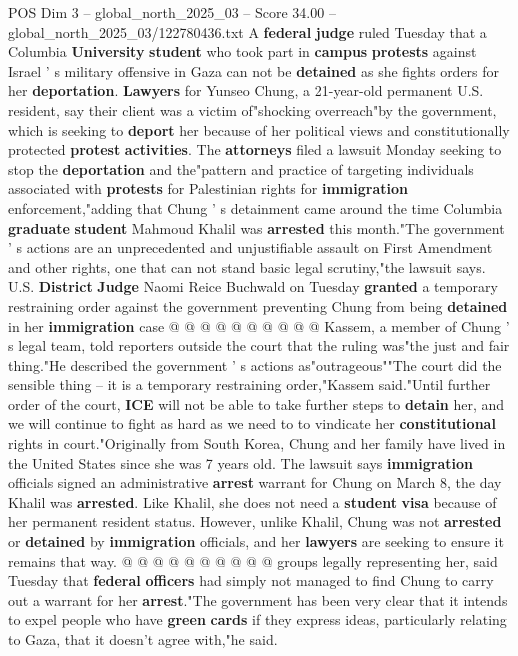 \begin{textsample}{POS Dim 3 – global\_north\_2025\_03 – Score 34.00 – global\_north\_2025\_03/122780436.txt}  \label{ex:f3_pos_027}
A \textbf{federal} \textbf{judge} ruled Tuesday that a Columbia \textbf{University} \textbf{student} who took part in \textbf{campus} \textbf{protests} against Israel ' s military offensive in Gaza can not be \textbf{detained} as she fights orders for her \textbf{deportation}. \textbf{Lawyers} for Yunseo Chung, a 21-year-old permanent U.S. resident, say their client was a victim of"shocking overreach"by the government, which is seeking to \textbf{deport} her because of her political views and constitutionally protected \textbf{protest} \textbf{activities}.
The \textbf{attorneys} filed a lawsuit Monday seeking to stop the \textbf{deportation} and the"pattern and practice of targeting individuals associated with \textbf{protests} for Palestinian rights for \textbf{immigration} enforcement,"adding that Chung ' s detainment came around the time Columbia \textbf{graduate} \textbf{student} Mahmoud Khalil was \textbf{arrested} this month."The government ' s actions are an unprecedented and unjustifiable assault on First Amendment and other rights, one that can not stand basic legal scrutiny,"the lawsuit says.
U.S. \textbf{District} \textbf{Judge} Naomi Reice Buchwald on Tuesday \textbf{granted} a temporary restraining order against the government preventing Chung from being \textbf{detained} in her \textbf{immigration} case @ @ @ @ @ @ @ @ @ @ Kassem, a member of Chung ' s legal team, told reporters outside the court that the ruling was"the just and fair thing."He described the government ' s actions as"outrageous""The court did the sensible thing -- it is a temporary restraining order,"Kassem said."Until further order of the court, \textbf{ICE} will not be able to take further steps to \textbf{detain} her, and we will continue to fight as hard as we need to to vindicate her \textbf{constitutional} rights in court."Originally from South Korea, Chung and her family have lived in the United States since she was 7 years old.
The lawsuit says \textbf{immigration} officials signed an administrative \textbf{arrest} warrant for Chung on March 8, the day Khalil was \textbf{arrested}.
Like Khalil, she does not need a \textbf{student} \textbf{visa} because of her permanent resident status.
However, unlike Khalil, Chung was not \textbf{arrested} or \textbf{detained} by \textbf{immigration} officials, and her \textbf{lawyers} are seeking to ensure it remains that way. @ @ @ @ @ @ @ @ @ @ groups legally representing her, said Tuesday that \textbf{federal} \textbf{officers} had simply not managed to find Chung to carry out a warrant for her \textbf{arrest}."The government has been very clear that it intends to expel people who have \textbf{green} \textbf{cards} if they express ideas, particularly relating to Gaza, that it doesn't agree with,"he said.

\end{textsample}
